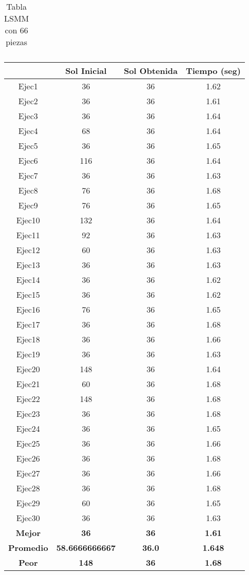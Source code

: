\begin{center}
\begin{table}
\begin{tabular}{|c|c|c|c|}
\end{tabular}
\caption{Tabla LSMM con 66 piezas}
\end{table}

\begin{table}

\begin{tabular}{|c|c|c|c|}

\hline
 & {\bf Sol Inicial} & {\bf Sol Obtenida} & {\bf Tiempo (seg)} \\
\hline
Ejec1 & 36 & 36  & 1.62 \\
\hline
Ejec2 & 36 & 36  & 1.61 \\
\hline
Ejec3 & 36 & 36  & 1.64 \\
\hline
Ejec4 & 68 & 36  & 1.64 \\
\hline
Ejec5 & 36 & 36  & 1.65 \\
\hline
Ejec6 & 116 & 36  & 1.64 \\
\hline
Ejec7 & 36 & 36  & 1.63 \\
\hline
Ejec8 & 76 & 36  & 1.68 \\
\hline
Ejec9 & 76 & 36  & 1.65 \\
\hline
Ejec10 & 132 & 36  & 1.64 \\
\hline
Ejec11 & 92 & 36  & 1.63 \\
\hline
Ejec12 & 60 & 36  & 1.63 \\
\hline
Ejec13 & 36 & 36  & 1.63 \\
\hline
Ejec14 & 36 & 36  & 1.62 \\
\hline
Ejec15 & 36 & 36  & 1.62 \\
\hline
Ejec16 & 76 & 36  & 1.65 \\
\hline
Ejec17 & 36 & 36  & 1.68 \\
\hline
Ejec18 & 36 & 36  & 1.66 \\
\hline
Ejec19 & 36 & 36  & 1.63 \\
\hline
Ejec20 & 148 & 36  & 1.64 \\
\hline
Ejec21 & 60 & 36  & 1.68 \\
\hline
Ejec22 & 148 & 36  & 1.68 \\
\hline
Ejec23 & 36 & 36  & 1.68 \\
\hline
Ejec24 & 36 & 36  & 1.65 \\
\hline
Ejec25 & 36 & 36  & 1.66 \\
\hline
Ejec26 & 36 & 36  & 1.68 \\
\hline
Ejec27 & 36 & 36  & 1.66 \\
\hline
Ejec28 & 36 & 36  & 1.68 \\
\hline
Ejec29 & 60 & 36  & 1.65 \\
\hline
Ejec30 & 36 & 36  & 1.63 \\
\hline
{\bf Mejor} & {\bf 36} & {\bf 36} & {\bf 1.61} \\
\hline
{\bf Promedio} & {\bf 58.6666666667} & {\bf 36.0} & {\bf 1.648} \\
\hline
{\bf Peor} & {\bf 148} & {\bf 36} & {\bf 1.68} \\
\hline




\end{tabular}
\end{table}
\end{center}
